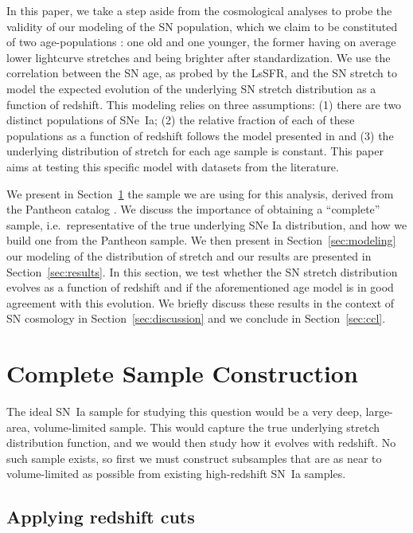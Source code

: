 \documentclass[]{aa}
\begin{document}
In this paper, we take a step aside from the cosmological analyses to
probe the validity of our modeling of the SN population, which we claim to be
constituted of two age-populations \citep{rigault2013,rigault2015,rigault2020}:
one old and one younger, the former having on average lower lightcurve stretches
and being brighter after standardization. We use the correlation between the SN
age, as probed by the LsSFR, and the SN stretch to model the expected evolution
of the underlying SN stretch distribution as a function of redshift. This
modeling relies on three assumptions: (1) there are two distinct populations of
SNe~Ia; (2) the relative fraction of each of these populations as a function of
redshift follows the model presented in \cite{rigault2020} and (3) the
underlying distribution of stretch for each age sample is constant. This paper
aims at testing this specific model with datasets from the literature. 

We present in Section~\ref{sec:sample} the sample we are using for this
analysis, derived from the Pantheon catalog \citep{scolnic2018a}. We discuss the
importance of obtaining a ``complete'' sample, i.e.\ representative of the true
underlying SNe Ia distribution, and how we build one from the Pantheon sample.
We then present in Section~\ref{sec:modeling} our modeling of the distribution
of stretch and our results are presented in Section~\ref{sec:results}. In this
section, we test whether the SN stretch distribution evolves as a function of
redshift and if the aforementioned age model is in good agreement with this
evolution. We briefly discuss these results in the context of SN cosmology in
Section~\ref{sec:discussion} and we conclude in Section~\ref{sec:ccl}.

\section{Complete Sample Construction}\label{sec:sample}

The ideal SN~Ia sample for studying this question would be a very deep,
    large-area, volume-limited sample. This would capture the true underlying
    stretch distribution function, and we would then study how it evolves with
    redshift. No such sample exists, so first we must construct subsamples that
are as near to volume-limited as possible from existing high-redshift SN~Ia
samples.

\subsection{Applying redshift cuts}\label{ssec:cuts}
\end{document}
